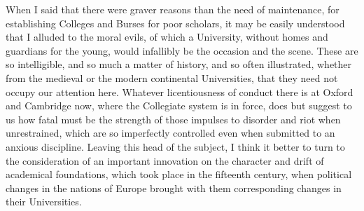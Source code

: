 When I said that there were
graver reasons than the need of maintenance, for establishing
Colleges and Burses for poor scholars, it may be easily understood
that I alluded to the moral evils, of which a University, without
homes and guardians for the young, would infallibly be the occasion
and the scene. These are so intelligible, and so much a matter of
history, and so often illustrated, whether from the medieval or the
modern continental Universities, that they need not occupy our
attention here. Whatever licentiousness of conduct there is at Oxford
and Cambridge now, where the Collegiate system is in force, does but
suggest to us how fatal must be the strength of those impulses to
disorder and riot when unrestrained, which are so imperfectly
controlled even when submitted to an anxious discipline. Leaving this
head of the subject, I think it better to turn to the consideration of
an important innovation on the character and drift of academical
foundations, which took place in the fifteenth century, when political
changes in the nations of Europe brought with them corresponding
changes in their Universities.

